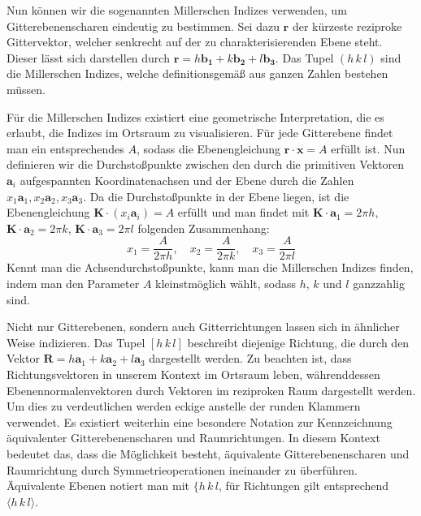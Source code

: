 Nun können wir die sogenannten Millerschen Indizes verwenden, um Gitterebenenscharen eindeutig zu bestimmen.
Sei dazu $\mathbf{r}$ der kürzeste reziproke Gittervektor, welcher senkrecht auf der zu charakterisierenden Ebene steht.
Dieser lässt sich darstellen durch $ \mathbf{r} = h \mathbf{b_1} + k \mathbf{b_2} + l \mathbf{b_3}$.
Das Tupel $(h\, k\,l)$ sind die Millerschen Indizes, welche definitionsgemäß aus ganzen Zahlen bestehen müssen.


Für die Millerschen Indizes existiert eine geometrische Interpretation, die es erlaubt, die Indizes im Ortsraum zu
visualisieren.
Für jede Gitterebene findet man ein entsprechendes $A$, sodass die Ebenengleichung $\mathbf{r} \cdot \mathbf{x} = A$
erfüllt ist.
Nun definieren wir die Durchstoßpunkte zwischen den durch die primitiven Vektoren $\mathbf{a}_i$ aufgespannten
Koordinatenachsen und der Ebene durch die Zahlen $x_{1}\mathbf{a}_{1}, x_{2}\mathbf{a}_{2}, x_{3}\mathbf{a}_{3}$.
Da die Durchstoßpunkte in der Ebene liegen, ist die Ebenengleichung $\mathbf{K}\cdot(x_{i}\mathbf{a}_{i})=A$ erfüllt und
man findet mit $\mathbf{K}\cdot\mathbf{a}_{1}=2\pi h$, $\mathbf{K}\cdot \mathbf{a}_{2}=2\pi k$,
$ \mathbf{K}\cdot \mathbf{a}_{3}=2\pi l$ folgenden Zusammenhang:
\begin{equation*}
    x_{1}=\frac{A}{2\pi h}, \quad x_{2}=\frac{A}{2\pi k}, \quad x_{3} =\frac{A}{2\pi l}
\end{equation*}
Kennt man die Achsendurchstoßpunkte, kann man die Millerschen Indizes finden, indem man den Parameter $A$
kleinstmöglich wählt, sodass $h$, $k$ und $l$ ganzzahlig sind. \autocite[115]{Ashcroft}

Nicht nur Gitterebenen, sondern auch Gitterrichtungen lassen sich in ähnlicher Weise indizieren. Das Tupel
$[h\,k\,l]$ beschreibt diejenige Richtung, die durch den Vektor $\mathbf{R} = h\mathbf{a}_{1}+k\mathbf{a}_{2}+
l\mathbf{a}_{3}$ dargestellt werden. Zu beachten ist, dass Richtungsvektoren in unserem Kontext im Ortsraum leben,
währenddessen Ebenennormalenvektoren durch Vektoren im reziproken Raum dargestellt werden. Um dies zu verdeutlichen werden
eckige anstelle der runden Klammern verwendet. Es existiert weiterhin eine besondere Notation zur Kennzeichnung äquivalenter
Gitterebenenscharen und Raumrichtungen. In diesem Kontext bedeutet das, dass die Möglichkeit besteht, äquivalente
Gitterebenenscharen und Raumrichtung durch Symmetrieoperationen ineinander zu überführen. Äquivalente Ebenen notiert man
mit $\{h \,k\, l $, für Richtungen gilt entsprechend $\langle h\, k \, l \rangle$.

